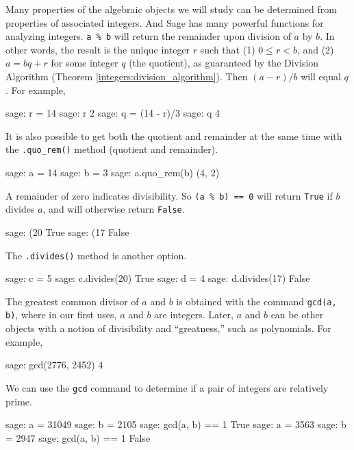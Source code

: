 Many properties of the algebraic objects we will study can be determined from properties of associated integers.  And Sage has many powerful functions for analyzing integers.
%
%
%
\verb?a % b? will return the remainder upon division of $a$ by $b$.  In other words, the result is the unique integer $r$ such that (1) $0\leq r< b$, and (2) $a=bq+r$ for some integer $q$ (the quotient), as guaranteed by the Division Algorithm (Theorem \ref{integers:division_algorithm}).  Then $(a-r)/b$ will equal $q$.  For example,
%
\begin{sageexample}
sage: r = 14 %
sage: r
2
sage: q = (14 - r)/3
sage: q
4
\end{sageexample}
%
It is also possible to get both the quotient and remainder at the same time with the \verb?.quo_rem()? method (quotient and remainder).
%
\begin{sageexample}
sage: a = 14
sage: b = 3
sage: a.quo_rem(b)
(4, 2)
\end{sageexample}
%
A remainder of zero indicates divisibility.  So \verb?(a % b) == 0?
will return \verb?True? if $b$ divides $a$, and will otherwise return \verb?False?.
%
\begin{sageexample}
sage: (20 %
True
sage: (17 %
False
\end{sageexample}
%
The \verb?.divides()? method is another option.
%
\begin{sageexample}
sage: c = 5
sage: c.divides(20)
True
sage: d = 4
sage: d.divides(17)
False
\end{sageexample}
%
%
The greatest common divisor of $a$ and $b$ is obtained with the command \verb?gcd(a, b)?, where in our first uses, $a$ and $b$ are integers.  Later, $a$ and $b$ can be other objects with a notion of divisibility and ``greatness,'' such as polynomials.  For example,
%
\begin{sageexample}
sage: gcd(2776, 2452)
4
\end{sageexample}
%
We can use the \verb?gcd? command to determine if a pair of integers are relatively prime.
%
\begin{sageexample}
sage: a = 31049
sage: b = 2105
sage: gcd(a, b) == 1
True
sage: a = 3563
sage: b = 2947
sage: gcd(a, b) == 1
False
\end{sageexample}
